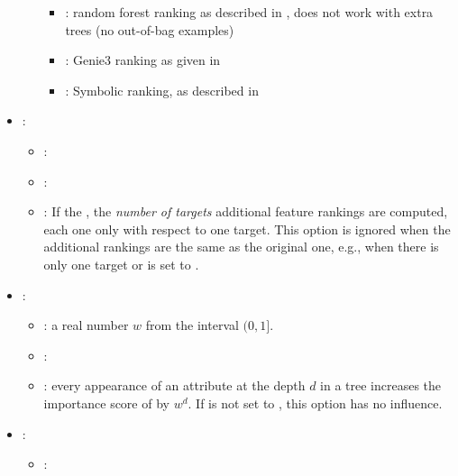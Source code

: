 \begin{itemize}
\begin{itemize}
\begin{itemize}
                        \item {}: random forest ranking as described in \cite{petkovic2017-ensemble-fr}, does not work with extra trees (no out-of-bag examples)
                        \item {}: Genie3 ranking as given in \cite{petkovic2017-ensemble-fr}
                        \item {}: Symbolic ranking, as described in \cite{petkovic2017-ensemble-fr}
                    \end{itemize}
           \end{itemize}
    \item {}:
           \begin{itemize}
                \item \optionPossibleValues{}: 
                \item \optionDefaultValue{}: 
                \item \optionDescrption{}: If the , the \textit{number of targets} additional feature rankings are computed, each one only with respect to one target.
                This option is ignored when the additional rankings are the same as the original one, e.g., when there is only one target or  is set to .
           \end{itemize}
    \item {}:
           \begin{itemize}
                \item \optionPossibleValues{}: a real number $w$ from the interval $(0, 1]$.
                \item \optionDefaultValue{}: 
                \item \optionDescrption{}: every appearance of an attribute at the depth $d$ in a tree increases the importance score of  by $w^d$. If  is not
                set to , this option has no influence.
           \end{itemize}
    \item {}:
           \begin{itemize}
                \item \optionPossibleValues{}: 

\end{itemize}
\end{itemize}
